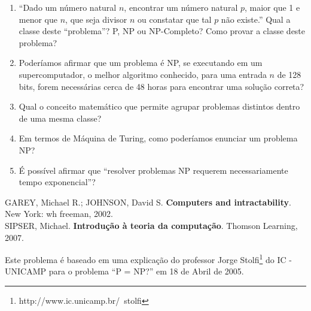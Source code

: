 \begin{enumerate}
\item{``Dado um número natural $n$, encontrar um número natural $p$, maior que 1
e menor que $n$, que seja divisor $n$ ou constatar que tal $p$ não existe.''
Qual a classe deste ``problema''? P, NP ou NP-Completo? Como provar a
classe deste problema?}

\item{Poderíamos afirmar que um problema é NP, se executando em um supercomputador,
o melhor algoritmo conhecido, para uma entrada $n$ de 128 bits, forem necessárias
cerca de 48 horas para encontrar
uma solução correta?}

\item{Qual o conceito matemático que permite agrupar problemas distintos dentro de uma mesma classe?}

\item{Em termos de Máquina de Turing, como poderíamos enunciar um problema NP?}

\item{É possível afirmar que ``resolver problemas NP requerem necessariamente tempo exponencial''?}

\end{enumerate}


\noindent

\noindent
GAREY, Michael R.; JOHNSON, David S. \textbf{Computers and intractability}. New York: wh freeman, 2002.\\

\noindent
SIPSER, Michael. \textbf{Introdução à teoria da computação}. Thomson Learning, 2007.\\



Este problema é baseado em uma explicação do
professor Jorge Stolfi\footnote{\scriptsize{http://www.ic.unicamp.br/~stolfi}} do IC - UNICAMP
para o problema ``P = NP?'' em 18 de Abril de 2005.

